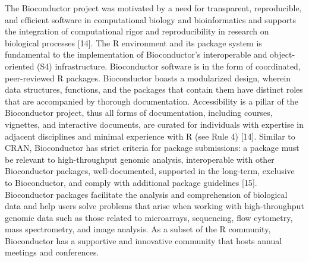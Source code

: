 \documentclass[10pt,letterpaper]{article}
\begin{document}
The Bioconductor project was motivated by a need for transparent,
reproducible, and efficient software in computational biology and
bioinformatics and supports the integration of computational rigor and
reproducibility in research on biological processes {[}14{]}. The R
environment and its package system is fundamental to the implementation
of Bioconductor's interoperable and object-oriented (S4) infrastructure.
Bioconductor software is in the form of coordinated, peer-reviewed R
packages. Bioconductor boasts a modularized design, wherein data
structures, functions, and the packages that contain them have distinct
roles that are accompanied by thorough documentation. Accessibility is a
pillar of the Bioconductor project, thus all forms of documentation,
including courses, vignettes, and interactive documents, are curated for
individuals with expertise in adjacent disciplines and minimal
experience with R (see Rule 4) {[}14{]}. Similar to CRAN, Bioconductor
has strict criteria for package submissions: a package must be relevant
to high-throughput genomic analysis, interoperable with other
Bioconductor packages, well-documented, supported in the long-term,
exclusive to Bioconductor, and comply with additional package guidelines
{[}15{]}. Bioconductor packages facilitate the analysis and
comprehension of biological data and help users solve problems that
arise when working with high-throughput genomic data such as those
related to microarrays, sequencing, flow cytometry, mass spectrometry,
and image analysis. As a subset of the R community, Bioconductor has a
supportive and innovative community that hosts annual meetings and
conferences.
\end{document}
